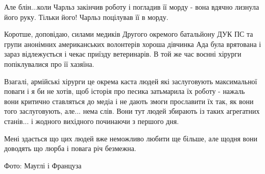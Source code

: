 Але блін...коли Чарльз закінчив роботу і погладив її морду - вона вдячно
лизнула його руку. Тільки його! Чарльз поцілував її в морду. 


Коротше, доповідаю, силами медиків Другого окремого батальйону ДУК ПС та групи
анонімних американських волонтерів  хороша дівчинка Ада була врятована і зараз
відлежується і чекає приїзду ветеринарів. В той же час воєнні хірурги
попіклувалися про її хазяїна. 

Взагалі, армійські хірурги це окрема каста людей які заслуговують максимальної
поваги і я би не хотів, щоб історія про песика затьмарила їх роботу - нажаль
вони критично ставляться до медіа і не дають змоги прославити їх так, як вони
того заслуговують, але... нема слів. Вони тут людей збирають із таких агрегатних
станів... і жодного вихідного починаючи з першого дня. 

Мені здається що цих людей вже неможливо любити ще більше, але  щодня вони
доводять що люрба і повага річ безмежна. 

Фото: Мауглі і Француза

